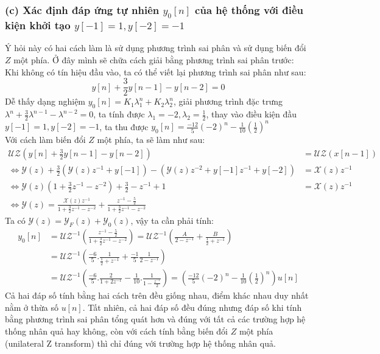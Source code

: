 \documentclass{article}
\begin{document}
\subsubsection*{(c) Xác định đáp ứng tự nhiên $y_{0}[n]$ của hệ thống với điều kiện khởi tạo $y[-1]=1, y[-2]=-1$}
Ý hỏi này có hai cách làm là sử dụng phương trình sai phân và sử dụng biến đổi $Z$ một phía. Ở đây mình sẽ chữa cách giải bằng phương trình sai phân trước:
\\Khi không có tín hiệu đầu vào, ta có thể viết lại phương trình sai phân như sau:
$$y[n]+\frac{3}{2}y[n-1]-y[n-2]=0$$
Dễ thấy dạng nghiệm $y_{0}[n]=K_{1}\lambda_{1}^{n}+K_{2}\lambda_{2}^{n}$, giải phương trình đặc trưng $\lambda^{n}+\frac{3}{2}\lambda^{n-1}-\lambda^{n-2}=0$, ta tính được $\lambda_{1}=-2 ,\lambda_{2}=\frac{1}{2}$, thay vào điều kiện đầu $y[-1]=1, y[-2]=-1$, ta thu được $y_{0}[n]=\frac{-12}{5}(-2)^{n}-\frac{1}{10}\left(\frac{1}{2}\right)^{n}$
\\Với cách làm biến đổi $Z$ một phía, ta sẽ làm như sau:
\begin{equation*}
\begin{split}
\mathscr{UZ}{\left(y[n]+\frac{3}{2}y[n-1]-y[n-2]\right)}&=\mathscr{UZ}(x[n-1])\\
\Leftrightarrow \mathscr{Y}(z)+\frac{3}{2}\left(\mathscr{Y}(z)z^{-1}+y[-1]\right)-(\mathscr{Y}(z)z^{-2}+y[-1]z^{-1}+y[-2])&= \mathscr{X}(z)z^{-1}\\ \Leftrightarrow \mathscr{Y}(z)\left(1+\frac{3}{2}z^{-1}-z^{-2}\right)+\frac{3}{2}-z^{-1}+1&=\mathscr{X}(z)z^{-1}\\\Leftrightarrow \mathscr{Y}(z)=\frac{\mathscr{X}(z)z^{-1}}{1+\frac{3}{2}z^{-1}-z^{-2}}+\frac{z^{-1}-\frac{5}{2}}{1+\frac{3}{2}z^{-1}-z^{-2}}
\end{split}
\end{equation*}
Ta có $\mathscr{Y}(z)=\mathscr{Y}_{F}(z)+\mathscr{Y}_{0}(z)$, vậy ta cần phải tính:
\begin{equation*}
\begin{split}
y_{0}[n]&=\mathscr{UZ}^{-1}\left(\frac{z^{-1}-\frac{5}{2}}{1+\frac{3}{2}z^{-1}-z^{-2}}\right)=\mathscr{UZ}^{-1}\left(\frac{A}{2-z^{-1}}+\frac{B}{\frac{1}{2}+z^{-1}}\right)\\&=\mathscr{UZ}^{-1}\left(\frac{-6}{5}.\frac{1}{\frac{1}{2}+z^{-1}}+\frac{-1}{5}\frac{1}{2-z^{-1}}\right)\\&=\mathscr{UZ}^{-1}\left(\frac{-6}{5}.\frac{2}{1+2z^{-1}}-\frac{1}{10}.\frac{1}{1-\frac{z^{-1}}{2}}\right)=\left(\frac{-12}{5}(-2)^{n}-\frac{1}{10}\left(\frac{1}{2}\right)^{n}\right)u[n]
\end{split}
\end{equation*}
Cả hai đáp số tính bằng hai cách trên đều giống nhau, điểm khác nhau duy nhất nằm ở thừa số $u[n]$. Tất nhiên, cả hai đáp số đều đúng nhưng đáp số khi tính bằng phương trình sai phân tổng quát hơn và đúng với tất cả các trường hợp hệ thống nhân quả hay không, còn với cách tính bằng biến đổi $Z$ một phía (unilateral Z transform) thì chỉ đúng với trường hợp hệ thống nhân quả.
\end{document}
